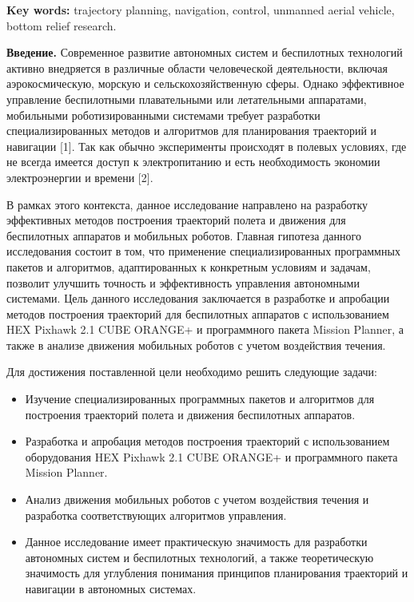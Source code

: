 {\bfseries Key words:} trajectory planning, navigation, control, unmanned
aerial vehicle, bottom relief research.
\begin{multicols}{2}

{\bfseries Введение.} Современное развитие автономных систем и беспилотных
технологий активно внедряется в различные области человеческой
деятельности, включая аэрокосмическую, морскую и сельскохозяйственную
сферы. Однако эффективное управление беспилотными плавательными или
летательными аппаратами, мобильными роботизированными системами требует
разработки специализированных методов и алгоритмов для планирования
траекторий и навигации {[}1{]}. Так как обычно эксперименты происходят в
полевых условиях, где не всегда имеется доступ к электропитанию и есть
необходимость экономии электроэнергии и времени {[}2{]}.

В рамках этого контекста, данное исследование направлено на разработку
эффективных методов построения траекторий полета и движения для
беспилотных аппаратов и мобильных роботов. Главная гипотеза данного
исследования состоит в том, что применение специализированных
программных пакетов и алгоритмов, адаптированных к конкретным условиям и
задачам, позволит улучшить точность и эффективность управления
автономными системами. Цель данного исследования заключается в
разработке и апробации методов построения траекторий для беспилотных
аппаратов с использованием HEX Pixhawk 2.1 CUBE ORANGE+ и программного
пакета Mission Planner, а также в анализе движения мобильных роботов с
учетом воздействия течения.

Для достижения поставленной цели необходимо решить следующие задачи:

\begin{itemize}
\item
  Изучение специализированных программных пакетов и алгоритмов для
  построения траекторий полета и движения беспилотных аппаратов.
\item
  Разработка и апробация методов построения траекторий с использованием
  оборудования HEX Pixhawk 2.1 CUBE ORANGE+ и программного пакета
  Mission Planner.
\item
  Анализ движения мобильных роботов с учетом воздействия течения и
  разработка соответствующих алгоритмов управления.
\item
  Данное исследование имеет практическую значимость для разработки
  автономных систем и беспилотных технологий, а также теоретическую
  значимость для углубления понимания принципов планирования траекторий
  и навигации в автономных системах.
\end{itemize}


\end{multicols}
